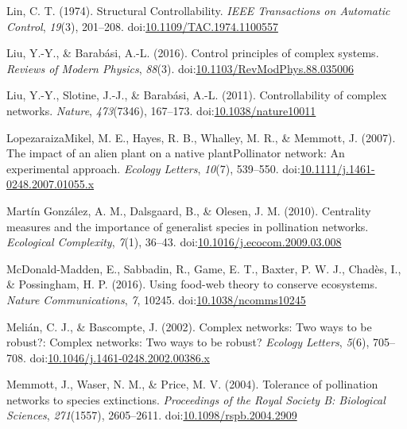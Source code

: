 \documentclass[a4paper]{artikel1}
\theoremstyle{definition}
\theoremstyle{definition}
\theoremstyle{definition}
\theoremstyle{remark}
\begin{document}
\hypertarget{ref-lin_structural_1974}{}
Lin, C. T. (1974). Structural Controllability. \emph{IEEE Transactions
on Automatic Control}, \emph{19}(3), 201--208.
doi:\href{https://doi.org/10.1109/TAC.1974.1100557}{10.1109/TAC.1974.1100557}

\hypertarget{ref-liu_control_2016}{}
Liu, Y.-Y., \& Barabási, A.-L. (2016). Control principles of complex
systems. \emph{Reviews of Modern Physics}, \emph{88}(3).
doi:\href{https://doi.org/10.1103/RevModPhys.88.035006}{10.1103/RevModPhys.88.035006}

\hypertarget{ref-liu_controllability_2011}{}
Liu, Y.-Y., Slotine, J.-J., \& Barabási, A.-L. (2011). Controllability
of complex networks. \emph{Nature}, \emph{473}(7346), 167--173.
doi:\href{https://doi.org/10.1038/nature10011}{10.1038/nature10011}

\hypertarget{ref-lopezaraizamikel_impact_2007}{}
Lopezaraiza\textendash{}Mikel, M. E., Hayes, R. B., Whalley, M. R., \&
Memmott, J. (2007). The impact of an alien plant on a native
plantPollinator network: An experimental approach. \emph{Ecology
Letters}, \emph{10}(7), 539--550.
doi:\href{https://doi.org/10.1111/j.1461-0248.2007.01055.x}{10.1111/j.1461-0248.2007.01055.x}

\hypertarget{ref-martin_gonzalez_centrality_2010}{}
Martín González, A. M., Dalsgaard, B., \& Olesen, J. M. (2010).
Centrality measures and the importance of generalist species in
pollination networks. \emph{Ecological Complexity}, \emph{7}(1), 36--43.
doi:\href{https://doi.org/10.1016/j.ecocom.2009.03.008}{10.1016/j.ecocom.2009.03.008}

\hypertarget{ref-mcdonald-madden_using_2016}{}
McDonald-Madden, E., Sabbadin, R., Game, E. T., Baxter, P. W. J.,
Chadès, I., \& Possingham, H. P. (2016). Using food-web theory to
conserve ecosystems. \emph{Nature Communications}, \emph{7}, 10245.
doi:\href{https://doi.org/10.1038/ncomms10245}{10.1038/ncomms10245}

\hypertarget{ref-melian_complex_2002}{}
Melián, C. J., \& Bascompte, J. (2002). Complex networks: Two ways to be
robust?: Complex networks: Two ways to be robust? \emph{Ecology
Letters}, \emph{5}(6), 705--708.
doi:\href{https://doi.org/10.1046/j.1461-0248.2002.00386.x}{10.1046/j.1461-0248.2002.00386.x}

\hypertarget{ref-memmott_tolerance_2004}{}
Memmott, J., Waser, N. M., \& Price, M. V. (2004). Tolerance of
pollination networks to species extinctions. \emph{Proceedings of the
Royal Society B: Biological Sciences}, \emph{271}(1557), 2605--2611.
doi:\href{https://doi.org/10.1098/rspb.2004.2909}{10.1098/rspb.2004.2909}
\end{document}
